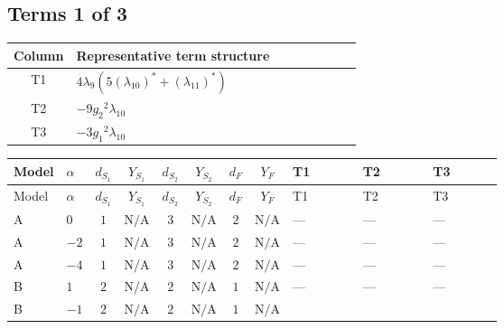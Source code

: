 \documentclass[8pt]{article}
\begin{document}
\begin{landscape}
\subsection*{Terms 1 of 3}
\begin{center}
\begin{tabular}{@{}c >{\raggedright\arraybackslash}p{0.82\linewidth}@{}}
\toprule
Column & Representative term structure \\
\midrule
T1 & \(\displaystyle 4 {\lambda_{9}} (5 \left({\lambda_{10}}\right)^{*}+\left({\lambda_{11}}\right)^{*})\) \\
\midrule
T2 & \(\displaystyle -9 {g_2}^2 {\lambda_{10}}\) \\
\midrule
T3 & \(\displaystyle -3 {g_1}^2 {\lambda_{10}}\) \\
\midrule
\bottomrule
\end{tabular}
\end{center}
\smallskip
\tiny
\begin{longtable}{@{}llcccccc >{\raggedright\arraybackslash}p{0.21\linewidth} >{\raggedright\arraybackslash}p{0.21\linewidth} >{\raggedright\arraybackslash}p{0.21\linewidth}@{}}
\toprule
Model & $\alpha$ & $d_{S_1}$ & $Y_{S_1}$ & $d_{S_2}$ & $Y_{S_2}$ & $d_F$ & $Y_F$ & T1 & T2 & T3 \\
\midrule
\endfirsthead
\toprule
Model & $\alpha$ & $d_{S_1}$ & $Y_{S_1}$ & $d_{S_2}$ & $Y_{S_2}$ & $d_F$ & $Y_F$ & T1 & T2 & T3 \\
\midrule
\endhead
A & $0$ & $1$ & $\text{N/A}$ & $3$ & $\text{N/A}$ & $2$ & $\text{N/A}$ & --- & --- & --- \\
\midrule
A & $-2$ & $1$ & $\text{N/A}$ & $3$ & $\text{N/A}$ & $2$ & $\text{N/A}$ & --- & --- & --- \\
\midrule
A & $-4$ & $1$ & $\text{N/A}$ & $3$ & $\text{N/A}$ & $2$ & $\text{N/A}$ & --- & --- & --- \\
\midrule
B & $1$ & $2$ & $\text{N/A}$ & $2$ & $\text{N/A}$ & $1$ & $\text{N/A}$ & --- & --- & --- \\
\midrule
B & $-1$ & $2$ & $\text{N/A}$ & $2$ & $\text{N/A}$ & $1$ & $\text{N/A}$ & \scriptsize\adjustbox{max width=\linewidth}{$\begin{gathered} 4 {\lambda_{9}} (5 \left({\lambda_{10}}\right)^{*}+\left({\lambda_{11}}\right)^{*})\end{gathered}$} & \scriptsize\adjustbox{max width=\linewidth}{$\begin{gathered} -9 {g_2}^2 {\lambda_{10}}\end{gathered}$} & \scriptsize\adjustbox{max width=\linewidth}{$\begin{gathered} -3 {g_1}^2 {\lambda_{10}}\end{gathered}$} \\

\end{longtable}
\end{landscape}
\end{document}
